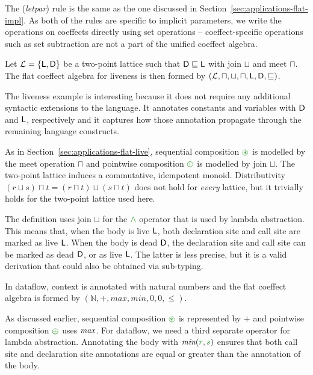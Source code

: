 The (\emph{letpar}) rule is the same as the one discussed in Section~\ref{sec:applications-flat-impl}.
As both of the rules are specific to implicit parameters, we write the operations on coeffects directly
using set operations -- coeffect-specific operations such as set subtraction are not a part of the
unified coeffect algebra.

\begin{example}[Liveness]
Let $\mathcal{L}=\{ \ident{L}, \ident{D} \}$ be a two-point lattice such that $\textnormal{\sffamily D} \sqsubseteq \textnormal{\sffamily L}$
with join $\sqcup$ and meet $\sqcap$. The flat coeffect algebra for liveness is then formed by
$(\mathcal{L}, \sqcap, \sqcup, \sqcap, \textnormal{\sffamily L}, \textnormal{\sffamily D}, \sqsubseteq)$.
\end{example}

\noindent
The liveness example is interesting because it does not require any additional syntactic extensions
to the language. It annotates constants and variables with $\textnormal{\sffamily D}$ and $\textnormal{\sffamily L}$, respectively
and it captures how those annotation propagate through the remaining language constructs.

As in Section~\ref{sec:applications-flat-live}, sequential composition $\cseq$ is modelled by
the meet operation $\sqcap$ and pointwise composition $\cpar$ is modelled by join $\sqcup$.
The two-point lattice induces a commutative, idempotent monoid. Distributivity
$(r \sqcup s) \sqcap t = (r \sqcap t) \sqcup (s \sqcap t)$ does not hold for \emph{every}
lattice, but it trivially holds for the two-point lattice used here.

The definition uses join $\sqcup$ for the $\czip$ operator that is used by lambda abstraction.
This means that, when the body is live $\textnormal{\sffamily L}$, both declaration site and call site are
marked as live $\textnormal{\sffamily L}$. When the body is dead $\textnormal{\sffamily D}$, the declaration site and call site
can be marked as dead $\textnormal{\sffamily D}$, or as live $\textnormal{\sffamily L}$. The latter is less precise, but it
is a valid derivation that could also be obtained via sub-typing.

\begin{example}[Dataflow]
In dataflow, context is annotated with natural numbers and the flat coeffect algebra is formed
by $(\mathbb{N}, +, \mathit{max}, \mathit{min}, 0, 0, \leq)$.
\end{example}

\noindent
As discussed earlier, sequential composition $\cseq$ is represented by $+$ and pointwise
composition $\cpar$ uses $\emph{max}$. For dataflow, we need a third separate operator for
lambda abstraction. Annotating the body with $\emph{min}(\cclrd{r}, \cclrd{s})$ ensures that
both call site and declaration site annotations are equal or greater than the annotation
of the body.

